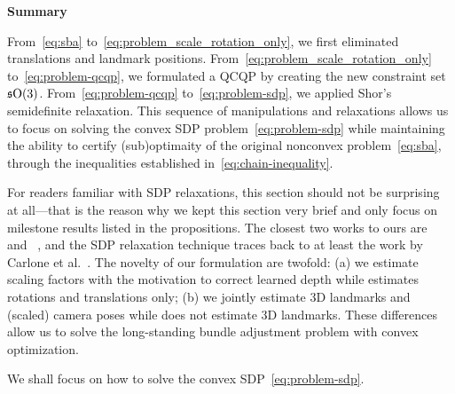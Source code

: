 \begin{tcolorbox}
    \begin{center}
        \vspace{-1mm}
        \textbf{Summary}
        \vspace{-1mm}
    \end{center} 
    From~\eqref{eq:sba} to~\eqref{eq:problem_scale_rotation_only}, we first eliminated translations and landmark positions. From~\eqref{eq:problem_scale_rotation_only} to~\eqref{eq:problem-qcqp}, we formulated a QCQP by creating the new constraint set $\mathfrak{s}\mathrm{O}(3)$. From~\eqref{eq:problem-qcqp} to~\eqref{eq:problem-sdp}, we applied Shor's semidefinite relaxation. This sequence of manipulations and relaxations allows us to focus on solving the convex SDP problem~\eqref{eq:problem-sdp} while maintaining the ability to certify (sub)optimaity of the original nonconvex problem~\eqref{eq:sba}, through the inequalities established in~\eqref{eq:chain-inequality}. 
\end{tcolorbox}


\begin{remark}\label{eq:connection}
    For readers familiar with SDP relaxations, this section should not be surprising at all---that is the reason why we kept this section very brief and only focus on milestone results listed in the propositions. The closest two works to ours are \sesync~\cite{rosen2019se} and \simsync~\cite{yu2024sim}, and the SDP relaxation technique traces back to at least the work by Carlone et al.~\cite{carlone2015lagrangian}. The novelty of our formulation are twofold: (a) we estimate scaling factors with the motivation to correct learned depth while \sesync estimates rotations and translations only; (b) we jointly estimate 3D landmarks and (scaled) camera poses while \simsync does not estimate 3D landmarks. These differences allow us to solve the long-standing bundle adjustment problem with convex optimization.
\end{remark}

We shall focus on how to solve the convex SDP~\eqref{eq:problem-sdp}.





